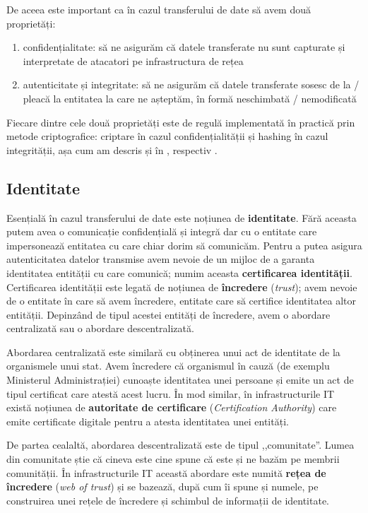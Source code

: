 De aceea este important ca în cazul transferului de date să avem două proprietăți:

\begin{enumerate}
  \item confidențialitate: să ne asigurăm că datele transferate nu sunt capturate și interpretate de atacatori pe infrastructura de rețea
  \item autenticitate și integritate: să ne asigurăm că datele transferate sosesc de la / pleacă la entitatea la care ne așteptăm, în formă neschimbată / nemodificată
\end{enumerate}

Fiecare dintre cele două proprietăți este de regulă implementată în practică prin metode criptografice: criptare în cazul confidențialității și hashing în cazul integrității, așa cum am descris și în , respectiv .

\subsection{Identitate}
\label{sec:sec:transfer:identity}

Esențială în cazul transferului de date este noțiunea de \textbf{identitate}. Fără aceasta putem avea o comunicație confidențială și integră dar cu o entitate care impersonează entitatea cu care chiar dorim să comunicăm. Pentru a putea asigura autenticitatea datelor transmise avem nevoie de un mijloc de a garanta identitatea entității cu care comunică; numim aceasta \textbf{certificarea identității}. Certificarea identității este legată de noțiunea de \textbf{încredere} (\textit{trust}); avem nevoie de o entitate în care să avem încredere, entitate care să certifice identitatea altor entității. Depinzând de tipul acestei entități de încredere, avem o abordare centralizată sau o abordare descentralizată.

Abordarea centralizată este similară cu obținerea unui act de identitate de la organismele unui stat. Avem încredere că organismul în cauză (de exemplu Ministerul Administrației) cunoaște identitatea unei persoane și emite un act de tipul certificat care atestă acest lucru. În mod similar, în infrastructurile IT există noțiunea de \textbf{autoritate de certificare} (\textit{Certification Authority}) care emite certificate digitale pentru a atesta identitatea unei entități.

De partea cealaltă, abordarea descentralizată este de tipul ,,comunitate''. Lumea din comunitate știe că cineva este cine spune că este și ne bazăm pe membrii comunității. În infrastructurile IT această abordare este numită \textbf{rețea de încredere} (\textit{web of trust}) și se bazează, după cum îi spune și numele, pe construirea unei rețele de încredere și schimbul de informații de identitate.

